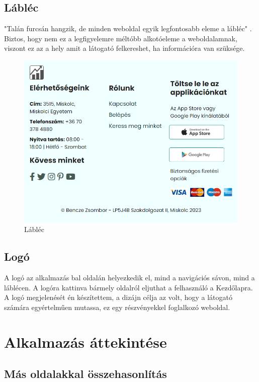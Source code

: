 \subsection{Lábléc}

"Talán furcsán hangzik, de minden weboldal egyik legfontosabb eleme a lábléc" \cite{contact}. Biztos, hogy nem ez a legfigyelemre méltóbb alkotóeleme a weboldalamnak, viszont ez az a hely amit a látogató felkereshet, ha információra van szüksége.

\begin{figure}[h]
\centering
\includegraphics[scale=0.5]{images/footer.png}
\caption{Lábléc}
\end{figure}

\subsection{Logó}

A logó az alkalmazás bal oldalán helyezkedik el, mind a navigációs sávon, mind a láblécen. A logóra kattinva bármely oldalról eljuthat a felhasználó a Kezdőlapra. A logó megjelenését én készítettem, a dizájn célja az volt, hogy a látogató számára egyértelműen mutassa, ez egy részvényekkel foglalkozó weboldal.

\section{Alkalmazás áttekintése}

\subsection{Más oldalakkal összehasonlítás}

